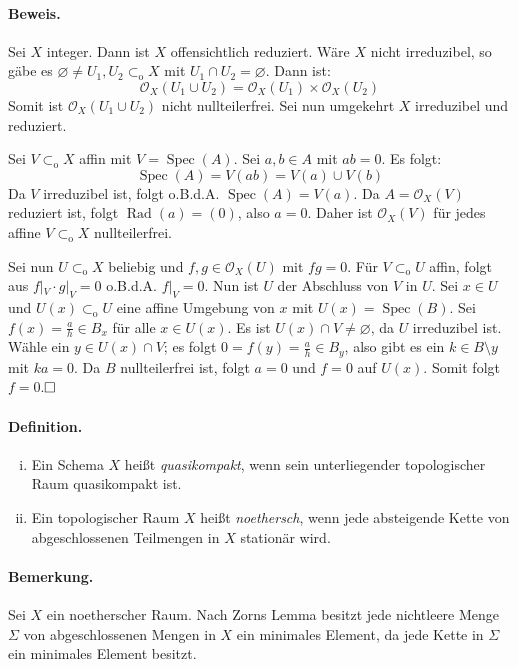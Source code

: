 \documentclass[11pt,b5paper,openany]{memoir}
\def \qed {$\hfill\square$}
\begin{document}
\paragraph{Beweis.} Sei $X$ integer. Dann ist $X$ offensichtlich reduziert. Wäre $X$ nicht irreduzibel, so gäbe es $\varnothing\neq U_1,U_2\subset_\text{o}X$ mit $U_1\cap U_2=\varnothing$. Dann ist:
\[\mathcal{O}_X(U_1\cup U_2)=\mathcal{O}_X(U_1)\times\mathcal{O}_X(U_2) \]
Somit ist $\mathcal{O}_X(U_1\cup U_2)$ nicht nullteilerfrei. Sei nun umgekehrt $X$ irreduzibel und reduziert.

Sei $V\subset_\text{o}X$ affin mit $V=\operatorname{Spec}(A)$. Sei $a,b\in A$ mit $ab=0$. Es folgt:
\[\operatorname{Spec}(A)=V(ab)=V(a)\cup V(b) \]
Da $V$ irreduzibel ist, folgt o.B.d.A. $\operatorname{Spec}(A)=V(a)$. Da $A=\mathcal{O}_X(V)$ reduziert ist, folgt $\operatorname{Rad}(a)=(0)$, also $a=0$. Daher ist $\mathcal{O}_X(V)$ für jedes affine $V\subset_\text{o}X$ nullteilerfrei. 

Sei nun $U\subset_\text{o}X$ beliebig und $f,g\in\mathcal{O}_X(U)$ mit $fg=0$. Für $V\subset_\text{o}U$ affin, folgt aus $f|_V\cdot g|_V=0$ o.B.d.A. $f|_V=0$. Nun ist $U$ der Abschluss von $V$ in $U$. Sei $x\in U$ und $U(x)\subset_\text{o}U$ eine affine Umgebung von $x$ mit $U(x)=\operatorname{Spec}(B)$. Sei $f(x)=\frac{a}{h}\in B_x$ für alle $x\in U(x)$. Es ist $U(x)\cap V\neq\varnothing$, da $U$ irreduzibel ist. Wähle ein $y\in U(x)\cap V$; es folgt $0=f(y)=\frac{a}{h}\in B_y$, also gibt es ein $k\in B\setminus y$ mit $ka=0$. Da $B$ nullteilerfrei ist, folgt $a=0$ und $f=0$ auf $U(x)$. Somit folgt $f=0$.\qed

\paragraph{Definition.} \begin{enumerate}[(i)]
\item Ein Schema $X$ heißt \textit{quasikompakt}, wenn sein unterliegender topologischer Raum quasikompakt ist.
\item Ein topologischer Raum $X$ heißt \textit{noethersch}, wenn jede absteigende Kette von abgeschlossenen Teilmengen in $X$ stationär wird.
\end{enumerate}

\paragraph{Bemerkung.} Sei $X$ ein noetherscher Raum. Nach Zorns Lemma besitzt jede nichtleere Menge $\Sigma$ von abgeschlossenen Mengen in $X$ ein minimales Element, da jede Kette in $\Sigma$ ein minimales Element besitzt.
\end{document}

